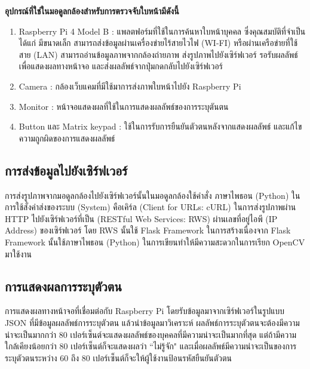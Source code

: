 \textbf{อุปกรณ์ที่ใช่ในมอดูลกล้องสำหรับการตรวจจับใบหน้ามีดังนี้}
\begin{enumerate}
  \item Raspberry Pi 4 Model B : แพลตฟอร์มที่ใช้ในการค้นหาใบหน้าบุคคล ซึ่งคุณสมบัติที่จำเป็นได้แก่ 
  มีขนาดเล็ก สามารถส่งข้อมูลผ่านเครื่องข่ายไร้สายไวไฟ (WI-FI) หรือผ่านเครือข่ายที่ใช้สาย (LAN) สามารถอ่านข้อมูลภาพจากกล้องถ่ายภาพ 
  ส่งรูปภาพไปยังเซิร์ฟเวอร์ รอรับผลลัพธ์เพื่อแสดงผลทางหน้าจอ และส่งผลลัพธ์จากปุ่มกดกลับไปยังเซิร์ฟเวอร์
  \item Camera : กล้องเว็บแคมที่มีใช้มาการส่งภาพใบหน้าไปยัง Raspberry Pi
  \item Monitor : หน้าจอแสดงผลที่ใช้ในการแสดงผลลัพธ์ของการระบุตันตน
  \item Button และ Matrix keypad : ใช้ในการรับการยืนยันตัวตนหลังจากแสดงผลลัพธ์ และแก้ไขความถูกผิดของการแสดงผลลัพธ์
\end{enumerate}

\subsection{การส่งข้อมูลไปยังเซิร์ฟเวอร์}
การส่งรูปภาพจากมอดูลกล้องไปยังเซิร์ฟเวอร์นั้นในมอดูลกล้องใช้คำสั่ง ภาษาไพธอน (Python) ในการใช้สั่งคำส่งของระบบ (System)
คือเคิร์ล  (Client for URLs: cURL) ในการส่งรูปภาพผ่าน HTTP ไปยังเซิร์ฟเวอร์ที่เป็น (RESTful Web Services: RWS)
ผ่านเลขที่อยู่ไอพี (IP Address) ของเซิร์ฟเวอร์ โดย RWS นั้นใช้ Flask Framework 
ในการสร้างเนื่องจาก Flask Framework นั้นใช้ภาษาไพธอน (Python) ในการเขียนทำให้มีความสะดวกในการเรียก OpenCV มาใช้งาน

\subsection{การแสดงผลการระบุตัวตน}
การแสดงผลทางหน้าจอที่เชื่อมต่อกับ Raspberry Pi โดยรับข้อมูลมาจากเซิร์ฟเวอร์ในรูปแบบ JSON ที่มีข้อมูลผลลัพธ์การระบุตัวตน แล้วนำข้อมูลมาวิเคราะห์
ผลลัพธ์การระบุตัวตนจะต้องมีความน่าจะเป็นมากกว่า 80 เปอร์เซ็นต์จะแสดงผลลัพธ์ของบุคคลที่มีความน่าจะเป็นมากที่สุด แต่ถ้ามีความใกล้เคียงน้อยกว่า 80 เปอร์เซ็นต์ก็จะแสดงผลว่า ``ไม่รู้จัก"
และเมื่อผลลัพธ์มีความน่าจะเป็นของการระบุตัวตนระหว่าง 60 ถึง 80 เปอร์เซ็นต์ก็จะให้ผู้ใช้งานป้อนรหัสยืนยันตัวตน

